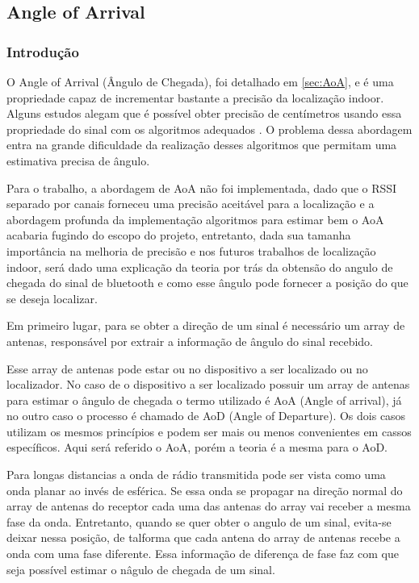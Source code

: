 \subsection{Angle of Arrival}

\subsubsection{Introdução}
\label{subsec:AoA-Intro}
O Angle of Arrival (Ângulo de Chegada), foi detalhado em \ref{sec:AoA}, e é uma propriedade capaz de incrementar bastante a precisão da localização indoor. Alguns estudos alegam que é possível obter precisão de centímetros usando essa propriedade do sinal com os algoritmos adequados \cite{art9}. O problema dessa abordagem entra na grande dificuldade da realização desses algoritmos que permitam uma estimativa precisa de ângulo. 

Para o trabalho, a abordagem de AoA não foi implementada, dado que o RSSI separado por canais forneceu uma precisão aceitável para a localização e a abordagem profunda da implementação algoritmos para estimar bem o AoA acabaria fugindo do escopo do projeto, entretanto, dada sua tamanha importância na melhoria de precisão e nos futuros trabalhos de localização indoor, será dado uma explicação da teoria por trás da obtensão do angulo de chegada do sinal de bluetooth e como esse ângulo pode fornecer a posição do que se deseja localizar.


Em primeiro lugar, para se obter a direção de um sinal é necessário um array de antenas, responsável por extrair a informação de ângulo do sinal recebido. 

Esse array de antenas pode estar ou no dispositivo a ser localizado ou no localizador. No caso de o dispositivo a ser localizado possuir um array de antenas para estimar o ângulo de chegada o termo utilizado é AoA (Angle of arrival), já no outro caso o processo é chamado de AoD (Angle of Departure). Os dois casos utilizam os mesmos princípios e podem ser mais ou menos convenientes em cassos específicos. \cite{techreport1}
Aqui será referido o AoA, porém a teoria é a mesma para o AoD.

Para longas distancias a onda de rádio transmitida pode ser vista como uma onda planar ao invés de esférica. Se essa onda se propagar na direção normal do array de antenas do receptor cada uma das antenas do array vai receber a mesma fase da onda. Entretanto, quando se quer obter o angulo de um sinal, evita-se deixar nessa posição, de talforma que cada antena do array de antenas recebe a onda com uma fase diferente. Essa informação de diferença de fase faz com que seja possível estimar o nâgulo de chegada de um sinal.

